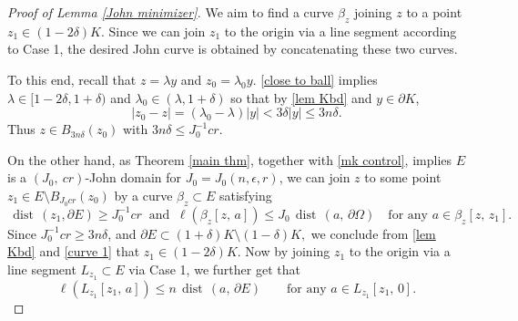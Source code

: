 \documentclass[reqno,11pt]{amsart}
\def\dist{{\mathop\mathrm{\,dist\,}}}
\numberwithin{equation}{section}
\theoremstyle{remark}
\begin{document}
\begin{proof}[Proof of Lemma \ref{John minimizer}]
  

We aim to find a curve $\beta_z$ joining $z$ to a point  $z_1\in (1-2\delta)K$. Since we can join $z_1$ to the origin via a line segment according to Case 1, the desired John curve is obtained by concatenating these two curves.

To this end, recall that $z=\lambda y$ and $z_0=\lambda_0 y$. 
 \eqref{close to ball} implies $\lambda\in [1-2\delta,1+\delta)$ and  $\lambda_0\in (\lambda, 1+\delta)$ so that by \eqref{lem Kbd} and $y\in \partial K$, 
$$|z_0-z|= (\lambda_0-\lambda)|y|< 3\delta|y|\le 3n\delta.$$ 
Thus $z\in B_{3n\delta}(z_0)$ with $3n \delta\le J_0^{-1}cr$. 

 
On the other hand, as Theorem \ref{main thm}, together with \eqref{mk control},  implies  $E$  is a $(J_0,\ c r)$-John domain for  $J_0=J_0(n, \epsilon, r)$, 
 we can  join $z$ to some point $z_1\in E\setminus B_{J_0cr}(z_0)$
by a curve $\beta_z\subset E$ satisfying
\begin{equation}\label{curve 1}
  \dist(z_1,\partial E)\ge J_0^{-1}cr \  \text{ and } \  \ell(\beta_z[z,\,a])\le J_0\dist(a,\,\partial \Omega) \quad  \text{for any } a\in \beta_z[z,\,z_1].
\end{equation}
Since $ J_0^{-1}cr\ge 3n\delta$, and $\partial E\subset (1+\delta) K\setminus (1-\delta)K,$ we conclude from \eqref{lem Kbd} and \eqref{curve 1} that
$z_1\in (1-2\delta)K$. Now by joining $z_1$ to the origin via a 
line segment $L_{z_1} \subset E$ via Case 1, we further get that
\begin{equation}\label{curve 2}
    \ell(L_{z_1}[z_1,\,a])\le n\dist(a,\,\partial E) \qquad  \text{for any } a\in L_{z_1}[z_1,\,0].
\end{equation}


\end{proof}
\end{document}
